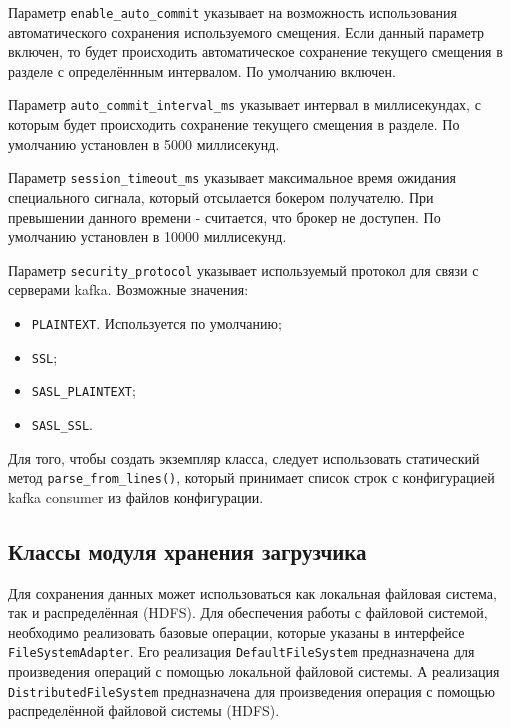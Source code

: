 Параметр \texttt{enable\_auto\_commit} указывает на возможность использования автоматического сохранения используемого смещения.
Если данный параметр включен, то будет происходить автоматическое сохранение текущего смещения в разделе с определённным интервалом.
По умолчанию включен.

Параметр \texttt{auto\_commit\_interval\_ms} указывает интервал в миллисекундах, с которым будет происходить сохранение текущего смещения в разделе.
По умолчанию установлен в 5000 миллисекунд.

Параметр \texttt{session\_timeout\_ms} указывает максимальное время ожидания специального сигнала, который отсылается бокером получателю.
При превышении данного времени - считается, что брокер не доступен.
По умолчанию установлен в 10000 миллисекунд.

Параметр \texttt{security\_protocol} указывает используемый протокол для связи с серверами kafka.
Возможные значения:
\begin{itemize}
    \item \texttt{PLAINTEXT}. Используется по умолчанию;
    \item \texttt{SSL};
    \item \texttt{SASL\_PLAINTEXT};
    \item \texttt{SASL\_SSL}.
\end{itemize}

Для того, чтобы создать экземпляр класса, следует использовать статический метод \texttt{parse\_from\_lines()}, который принимает список строк с конфигурацией kafka consumer из файлов конфигурации.





\subsection{Классы модуля хранения загрузчика}
Для сохранения данных может использоваться как локальная файловая система, так и распределённая (HDFS).
Для обеспечения работы с файловой системой, необходимо реализовать базовые операции, которые указаны в интерфейсе \texttt{FileSystemAdapter}.
Его реализация \texttt{DefaultFileSystem} предназначена для произведения операций с помощью локальной файловой системы.
А реализация \texttt{DistributedFileSystem} предназначена для произведения операция с помощью распределённой файловой системы (HDFS).

